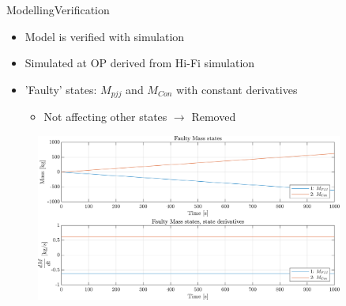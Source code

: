 
\begin{frame}{Modelling}{Verification}
	\begin{itemize}
		\item Model is verified with simulation
		\item Simulated at OP derived from Hi-Fi simulation
		\item 'Faulty' states: $M_{pjj}$ and $M_{Con}$ with constant derivatives
		\begin{itemize}
			\item Not affecting other states $\rightarrow$ Removed
		\end{itemize}
	\end{itemize}
	\begin{figure}[h]
		\centering
		\includegraphics[width=0.9\textwidth]{../Graphics/nonlin_sim_faulty_Mass.png}
		\label{fig:non_lin_sim_faulty_Mass}
	\end{figure}
\end{frame}





